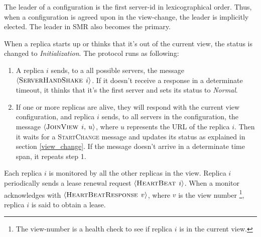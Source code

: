 \documentclass[times, 10pt,twocolumn]{article}
\begin{document}
 \label{leader_election}
The leader of a configuration is the first server-id in lexicographical order. Thus,
when a configuration is agreed upon in the view-change, the leader is implicitly elected.
The leader in SMR also becomes the primary.

 \label{init}
When a replica starts up or thinks that it's out of the current view, the status is changed to \textit{Initialization}. The protocol runs as following:
\begin{enumerate}
  \item A replica $i$ sends, to a all possible servers, the message $\left \langle \textsc{ServerHandShake} \: \: i \right \rangle$. If it doesn't receive a response in a determinate timeout, 
  it thinks that it's the first server and sets its status to \textit{Normal}.
  
  \item If one or more replicas are alive, they will respond with the current view
  configuration, and replica $i$ sends, to all servers in the 
  configuration, the message $\left \langle \textsc{JoinView} \: \: i, \: u \right \rangle$, 
  where $u$ represents the URL of the replica $i$. Then it waits for a \textsc{StartChange} message
  and updates its status as explained in section \ref{view_change}.
  If the message doesn't arrive in a determinate time span, it repeats step 1.
  
\end{enumerate}

 \label{failure_detector}
Each replica $i$ is monitored by all the other replicas in the view. Replica $i$ periodically 
sends a lease renewal request $\left \langle \textsc{HeartBeat} \: \: i \right \rangle$.
When a monitor acknowledges with $\left \langle \textsc{HeartBeatResponse} \: \: v \right \rangle$, 
where $v$ is the view number%
\footnote
   {%
     The view-number is a health check to see if replica $i$ is in the current view.
   }, 
   replica $i$ is said to obtain a lease.


\end{document}
